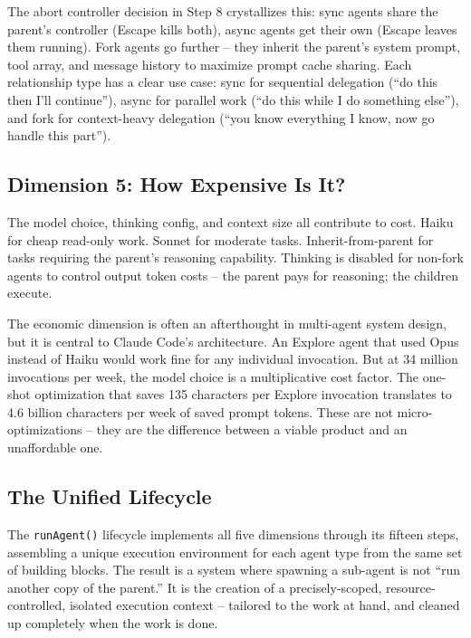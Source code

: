 \documentclass[
  english,
  11pt,
  letterpaper,
]{book}
\begin{document}
The abort controller decision in Step 8 crystallizes this: sync agents
share the parent's controller (Escape kills both), async agents get
their own (Escape leaves them running). Fork agents go further -- they
inherit the parent's system prompt, tool array, and message history to
maximize prompt cache sharing. Each relationship type has a clear use
case: sync for sequential delegation (``do this then I'll continue''),
async for parallel work (``do this while I do something else''), and
fork for context-heavy delegation (``you know everything I know, now go
handle this part'').

\subsection{Dimension 5: How Expensive Is
It?}\label{dimension-5-how-expensive-is-it}

The model choice, thinking config, and context size all contribute to
cost. Haiku for cheap read-only work. Sonnet for moderate tasks.
Inherit-from-parent for tasks requiring the parent's reasoning
capability. Thinking is disabled for non-fork agents to control output
token costs -- the parent pays for reasoning; the children execute.

The economic dimension is often an afterthought in multi-agent system
design, but it is central to Claude Code's architecture. An Explore
agent that used Opus instead of Haiku would work fine for any individual
invocation. But at 34 million invocations per week, the model choice is
a multiplicative cost factor. The one-shot optimization that saves 135
characters per Explore invocation translates to 4.6 billion characters
per week of saved prompt tokens. These are not micro-optimizations --
they are the difference between a viable product and an unaffordable
one.

\subsection{The Unified Lifecycle}\label{the-unified-lifecycle}

The \texttt{runAgent()} lifecycle implements all five dimensions through
its fifteen steps, assembling a unique execution environment for each
agent type from the same set of building blocks. The result is a system
where spawning a sub-agent is not ``run another copy of the parent.'' It
is the creation of a precisely-scoped, resource-controlled, isolated
execution context -- tailored to the work at hand, and cleaned up
completely when the work is done.
\end{document}
